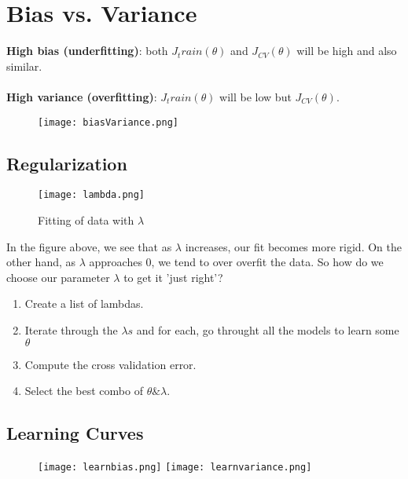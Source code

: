 
\section{Bias vs. Variance}
  \textbf{High bias (underfitting)}: both $J_train(\theta)$ and $J_{CV}(\theta)$ will be high and also similar.
  \\\\
  \textbf{High variance (overfitting)}: $J_train(\theta)$ will be low but $J_{CV}(\theta)$.\\

  \begin{figure}[h]
    \centering
    \texttt{[image: biasVariance.png]}
  \end{figure}

  \subsection{Regularization}

    \begin{figure}[h]
      \centering
      \texttt{[image: lambda.png]}
      \caption{Fitting of data with $\lambda$}
    \end{figure}

    In the figure above, we see that as $\lambda$ increases, our fit becomes more rigid. On the other hand, as $\lambda$ approaches 0, we tend to over overfit the data. So how do we choose our parameter $\lambda$ to get it 'just right'?

    \begin{enumerate}
      \item Create a list of lambdas.
      \item Iterate through the $\lambda s$ and for each, go throught all the models to learn some $\theta$
      \item Compute the cross validation error.
      \item Select the best combo of $\theta \& \lambda$.
    \end{enumerate}    

  \subsection{Learning Curves}
    \begin{figure}[h]
      \centering
      \texttt{[image: learnbias.png]}
      \texttt{[image: learnvariance.png]}
    \end{figure}    

